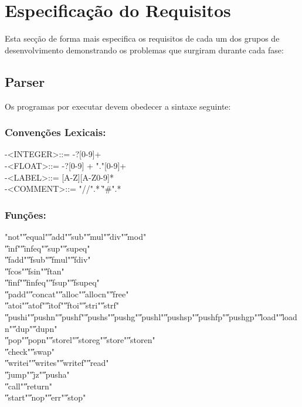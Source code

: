 \documentclass{report}
\begin{document}
\section{Especificação do Requisitos}
\quad Esta secção de forma mais especifica os requisitos de cada um dos grupos de desenvolvimento demonstrando os problemas que
surgiram durante cada fase:

\subsection{Parser}

\quad Os programas por executar devem obedecer a sintaxe seguinte:

\subsubsection{Convenções Lexicais:}

 -\quad \textless INTEGER\textgreater \quad ::= -?[0-9]+\\
 -\quad \textless FLOAT\textgreater   \quad ::= -?[0-9] + "."[0-9]+\\
 -\quad \textless LABEL\textgreater   \quad ::= [A-Z][A-Z0-9]* \\
 -\quad \textless COMMENT\textgreater \quad ::= "//".* \quad \| \quad "\#".*\\

\subsubsection{Funções:}

"not"\|"equal"\|"add"\|"sub"\|"mul"\|"div"\|"mod"\|\\
\|"inf"\|"infeq"\|"sup"\|"supeq"\|\\
\|"fadd"\|"fsub"\|"fmul"\|"fdiv"\|\\
\|"fcos"\|"fsin"\|"ftan"\|\\
\|"finf"\|"finfeq"\|"fsup"\|"fsupeq"\|\\
\|"padd"\|"concat"\|"alloc"\|"allocn"\|"free"\|\\
\|"atoi"\|"atof"\|"itof"\|"ftoi"\|"stri"\|"strf"\|\\
\|"pushi"\|"pushn"\|"pushf"\|"pushs"\|"pushg"\|"pushl"\|"pushsp"\|"pushfp"\|"pushgp"\|"load"\|"loadn"\|"dup"\|"dupn"\|\\
\|"pop"\|"popn"\|"storel"\|"storeg"\|"store"\|"storen"\|\\
\|"check"\|"swap"\|\\
\|"writei"\|"writes"\|"writef"\|"read"\|\\
\|"jump"\|"jz"\|"pusha"\|\\
\|"call"\|"return"\|\\
\|"start"\|"nop"\|"err"\|"stop"\\
\end{document}
